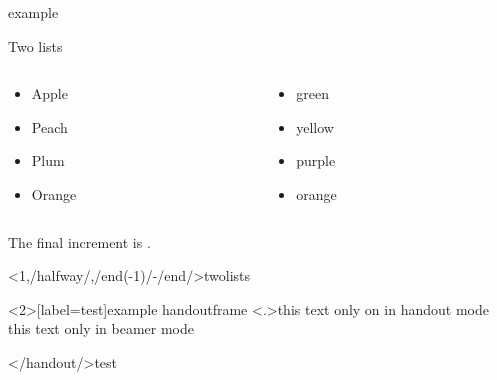 \documentclass[\jobname]{beamer} %
\begin{document}
\begin{frame}[label=twolists]{example \theexampc}
  \resetincr
  \begin{center}
    Two lists \\
  \end{center}
  \begin{columns}
    \begin{column}{.2\textwidth}
      \begin{itemize}[<+-| alert@+>]
      \item Apple \item Peach  \item Plum \item Orange
      \end{itemize}
    \end{column}
    \begin{column}{.2\textwidth}
      \resetincr[/startlist/]%
      \begin{itemize}[<+-| alert@+>]
      \item green \item yellow \item purple \item orange
      \end{itemize}
    \end{column}
  \end{columns}
  \vfill
  \onslide<+->
  The final increment is . 
\end{frame}

\againframe<1,/halfway/,/end(-1)/-/end/>{twolists}

\begin{examp}
  \resetincr[2]
\end{examp}

\begin{frame}<2>[label=test]{example handoutframe}
  \resetincr
  \only<.>{this text only on in handout mode\\}
  \onslide<+->
  this text only in beamer mode\\
\end{frame}

</handout/>{test}
\end{document}
